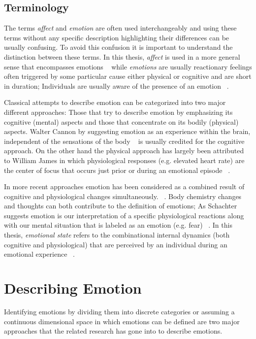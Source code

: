 \subsection{Terminology}

The terms \textit{affect} and \textit{emotion} are often used interchangeably and using these terms without any specific description highlighting their differences can be usually confusing. To avoid this confusion it is important to understand the distinction between these terms. In this thesis, \textit{affect} is used in a more general sense that encompasses emotions ~\cite{forgas1995mood} while \textit{emotions} are usually reactionary feelings often triggered by some particular cause either physical or cognitive and are short in duration; Individuals are usually aware of the presence of an emotion ~\cite{paiva2007affective}.

Classical attempts to describe emotion can be categorized into two major different approaches: Those that try to describe emotion by emphasizing its cognitive (mental) aspects and those that concentrate on its bodily (physical) aspects. Walter Cannon by suggesting emotion as an experience within the brain, independent of the sensations of the body ~\cite{cannon1927james} is usually credited for the cognitive approach. On the other hand the physical approach has largely been attributed to William James in which physiological responses (e.g. elevated heart rate) are the center of focus that occurs just prior or during an emotional episode ~\cite{paiva2007affective}.

In more recent approaches emotion has been considered as a combined result of cognitive and physiological changes simultaneously. ~\cite{paiva2007affective}. Body chemistry changes and thoughts can both contribute to the definition of emotions; As Schachter suggests emotion is our interpretation of a specific physiological reactions along with our mental situation that is labeled as an emotion (e.g. fear) ~\cite{schachter1964interaction}. In this thesis, \textit{emotional state} refers to the combinational internal dynamics (both cognitive and physiological) that are perceived by an individual during an emotional experience ~\cite{paiva2007affective}.

\section{Describing Emotion}

Identifying emotions by dividing them into discrete categories or assuming a continuous dimensional space in which emotions can be defined are two major approaches that the related research has gone into to describe emotions.

